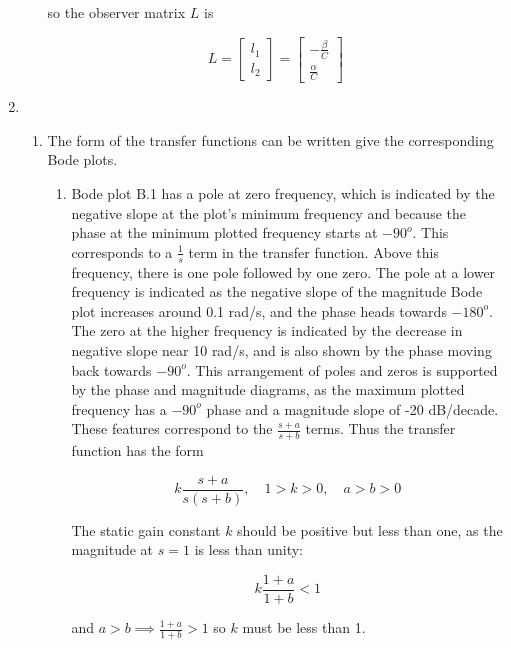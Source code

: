 \documentclass[11pt]{article}
\theoremstyle{definition}
\begin{document}
\begin{enumerate}
\begin{enumerate}
        so the observer matrix $L$ is 

        $$ L = \begin{bmatrix} l_1 \\ l_2 \end{bmatrix} = \begin{bmatrix} -\frac{\beta}{C} \\  \frac{\alpha}{C} \end{bmatrix} $$

    \end{enumerate}


    \item %
    \begin{enumerate}
        \item %
        The form of the transfer functions can be written give the corresponding Bode plots.

        \begin{enumerate}

            \item %
            Bode plot B.1 has a pole at zero frequency, which is indicated by the negative slope at the plot's minimum frequency and because the phase at the minimum plotted frequency starts at $-90^o$.  This corresponds to a $\frac{1}{s}$ term in the transfer function.  Above this frequency, there is one pole followed by one zero.  The pole at a lower frequency is indicated as the negative slope of the magnitude Bode plot increases around 0.1 rad/s, and the phase heads towards $-180^o$.  The zero at the higher frequency is indicated by the decrease in negative slope near 10 rad/s, and is also shown by the phase moving back towards $-90^o$.  This arrangement of poles and zeros is supported by the phase and magnitude diagrams, as the maximum plotted frequency has a $-90^o$ phase and a magnitude slope of -20 dB/decade.  These features correspond to the  $\frac{s + a}{s + b}$ terms.  Thus the transfer function has the form

            $$ k \frac{s + a}{s(s + b)}, \quad 1 > k > 0, \quad a > b > 0 $$

            The static gain constant $k$ should be positive but less than one, as the magnitude at $s = 1$ is less than unity:

            $$ k \frac{1 + a}{1 + b} < 1 $$

            and $a > b \implies \frac{1 + a}{1 + b} > 1$ so $k$ must be less than 1.


\end{enumerate}
\end{enumerate}
\end{enumerate}
\end{document}

